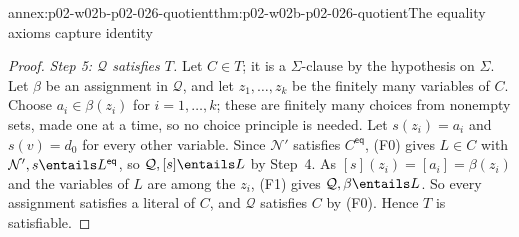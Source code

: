 \begin{annexitem}{annex:p02-w02b-p02-026-quotient}{thm:p02-w02b-p02-026-quotient}{The equality axioms capture identity}
\begin{proof}
\emph{Step 5: \(\mathcal Q\) satisfies \(T\).}  Let \(C\in T\); it is a
\(\Sigma\)-clause by the hypothesis on \(\Sigma\).  Let \(\beta\) be an
assignment in \(\mathcal Q\), and let \(z_1,\ldots,z_k\) be the finitely many
variables of \(C\).  Choose \(a_i\in\beta(z_i)\) for \(i=1,\ldots,k\); these
are finitely many choices from nonempty sets, made one at a time, so no choice
principle is needed.  Let \(s(z_i)=a_i\) and \(s(v)=d_0\) for every other
variable.  Since \(\mathcal N'\) satisfies \(C^{\mathsf{eq}}\), (F0) gives
\(L\in C\) with \(\mathcal N',s\entails L^{\mathsf{eq}}\), so
\(\mathcal Q,[s]\entails L\) by Step~4.  As \([s](z_i)=[a_i]=\beta(z_i)\) and
the variables of \(L\) are among the \(z_i\), (F1) gives
\(\mathcal Q,\beta\entails L\).  So every assignment satisfies a literal of
\(C\), and \(\mathcal Q\) satisfies \(C\) by (F0).  Hence \(T\) is
satisfiable.
\end{proof}
\end{annexitem}

